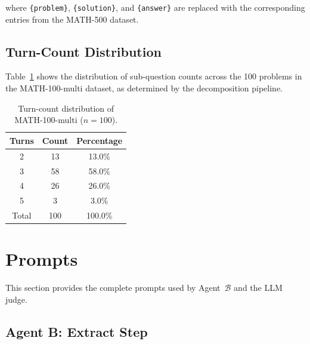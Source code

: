 \noindent where \verb|{problem}|, \verb|{solution}|, and \verb|{answer}| are replaced with the corresponding entries from the MATH-500 dataset.

\subsection{Turn-Count Distribution}
\label{app:turn_dist}

Table~\ref{tab:turn_dist} shows the distribution of sub-question counts across the 100 problems in the MATH-100-multi dataset, as determined by the decomposition pipeline.

\begin{table}[h]
\centering
\begin{tabular}{ccc}
\toprule
\textbf{Turns} & \textbf{Count} & \textbf{Percentage} \\
\midrule
2 & 13 & 13.0\% \\
3 & 58 & 58.0\% \\
4 & 26 & 26.0\% \\
5 &  3 &  3.0\% \\
\midrule
Total & 100 & 100.0\% \\
\bottomrule
\end{tabular}
\caption{Turn-count distribution of MATH-100-multi ($n=100$).}
\label{tab:turn_dist}
\end{table}

\section{Prompts}
\label{app:prompts}

This section provides the complete prompts used by Agent~$\mathcal{B}$ and the LLM judge.

\subsection{Agent B: Extract Step}
\label{app:agent_b_prompt}

